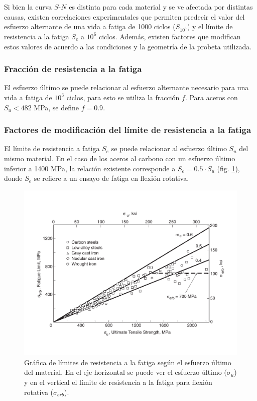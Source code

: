 Si bien la curva $S$-$N$ es distinta para cada material y se ve afectada por distintas causas, existen correlaciones experimentales que permiten predecir el valor del esfuerzo alternante de una vida a fatiga de 1000 ciclos ($S_{10^3}$) y el límite de resistencia a la fatiga $S_e$ a $10^6$ ciclos. Además, existen factores que modifican estos valores de acuerdo a las condiciones y la geometría de la probeta utilizada.

\subsubsection{Fracción de resistencia a la fatiga}
El esfuerzo último se puede relacionar al esfuerzo alternante necesario para una vida a fatiga de $10^3$ ciclos, para esto se utiliza la fracción $f$. Para aceros con $S_u < 482$ MPa, se define $f = 0.9$.

\subsubsection{Factores de modificación del límite de resistencia a la fatiga}
El límite de resistencia a fatiga $S_e$ se puede relacionar al esfuerzo último $S_u$ del mismo material. En el caso de los aceros al carbono con un esfuerzo último inferior a 1400 MPa, la relación existente corresponde a $S_e  = 0.5 \cdot S_u$ (fig. \ref{fig:se_su}), donde $S_e$ se refiere a un ensayo de fatiga en flexión rotativa.

\begin{figure}[h]
\centering
\includegraphics[width=\linewidth, trim={1cm 2cm 1cm 2cm},clip]{Imagenes/se_su.pdf}
\caption{Gráfica de límites de resistencia a la fatiga según el esfuerzo último del material. En el eje horizontal se puede ver el esfuerzo último ($\sigma_u$) y en el vertical el límite de resistencia a la fatiga para flexión rotativa ($\sigma_{erb}$). \cite{dowling2013mechanical}}
\label{fig:se_su}
\end{figure}

